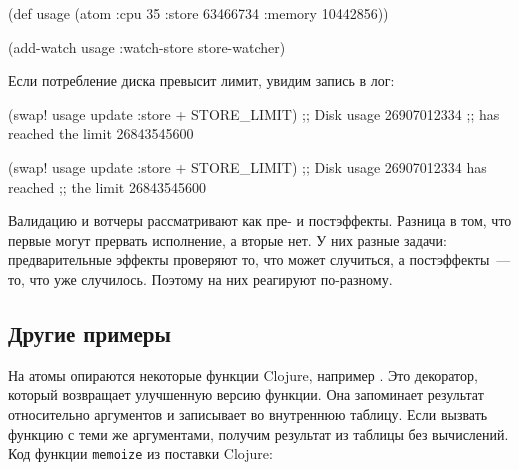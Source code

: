 \else

\begin{english}
  \begin{clojure}
(def usage
  (atom {:cpu 35
         :store 63466734
         :memory 10442856}))

(add-watch usage :watch-store store-watcher)
  \end{clojure}
\end{english}

\fi

\noindent
Если потребление диска превысит лимит, увидим запись в лог:

\ifnarrow

\begin{english}
  \begin{clojure}
(swap! usage update :store + STORE_LIMIT)
;; Disk usage 26907012334
;; has reached the limit 26843545600
  \end{clojure}
\end{english}

\else

\begin{english}
  \begin{clojure}
(swap! usage update :store + STORE_LIMIT)
;; Disk usage 26907012334 has reached
;; the limit 26843545600
  \end{clojure}
\end{english}

\fi

Валидацию и вотчеры рассматривают как пре- и постэффекты. Разница в том, что
первые могут прервать исполнение, а вторые нет. У них разные задачи:
предварительные эффекты проверяют то, что может случиться, а постэффекты~--- то,
что уже случилось. Поэтому на них реагируют по-разному.

\subsection{Другие примеры}


На атомы опираются некоторые функции Clojure, например . Это
декоратор, который возвращает улучшенную версию функции. Она запоминает
результат относительно аргументов и записывает во внутреннюю таблицу. Если
вызвать функцию с теми же аргументами, получим результат из таблицы без
вычислений. Код функции \verb|memoize| из поставки Clojure:


